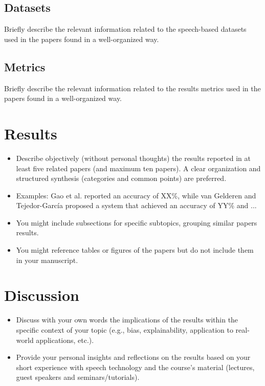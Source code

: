 \documentclass{Interspeech2024}
\begin{document}
\subsection{Datasets}
Briefly describe the relevant information related to the speech-based datasets used in the papers found in a well-organized way.

\subsection{Metrics}
Briefly describe the relevant information related to the results metrics used in the papers found in a well-organized way.


\section{Results}
\begin{itemize}
    \item Describe objectively (without personal thoughts) the results reported in at least five related papers (and maximum ten papers). A clear organization and structured synthesis (categories and common points) are preferred. 
    \item Examples: Gao et al. \cite{gao2024} reported an accuracy of XX\%, while van Gelderen and Tejedor-García \cite{vanGelderen2024} proposed a system that achieved an accuracy of YY\% and \cite{zhou2023comprehensive}...
    \item You might include subsections for specific subtopics, grouping similar papers results.
    \item You might reference tables or figures of the papers but do not include them in your manuscript.
\end{itemize}



\section{Discussion}
\begin{itemize}
    \item Discuss with your own words the implications of the results within the specific context of your topic (e.g., bias, explainability, application to real-world applications, etc.).
    \item Provide your personal insights and reflections on the results based on your short experience with speech technology and the course’s material (lectures, guest speakers and seminars/tutorials).
\end{itemize}
\end{document}

